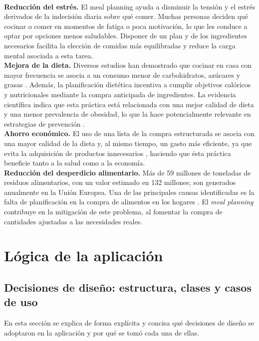 \documentclass[twoside, openright, 11pt]{report}
\begin{document}
	  \\
	  \textbf{Reducción del estrés.} El meal planning ayuda a disminuir la tensión y el estrés derivados de la indecisión diaria sobre qué comer. Muchas personas deciden qué cocinar o comer en momentos de fatiga o poca motivación, lo que les conduce a optar por opciones menos saludables. Disponer de un plan y de los ingredientes necesarios facilita la elección de comidas más equilibradas y reduce la carga mental asociada a esta tarea.
	  \\
	  \textbf{Mejora de la dieta.} Diversos estudios han demostrado que cocinar en casa con mayor frecuencia se asocia a un consumo menor de carbohidratos, azúcares y grasas \cite{johnshopkins2014}. Además, la planificación dietética incentiva a cumplir objetivos calóricos y nutricionales mediante la compra anticipada de ingredientes. La evidencia científica indica que esta práctica está relacionada con una mejor calidad de dieta y una menor prevalencia de obesidad, lo que la hace potencialmente relevante en estrategias de prevención \cite{ducrot2017}.
	  \\
	  \textbf{Ahorro económico.} El uso de una lista de la compra estructurada se asocia con una mayor calidad de la dieta y, al mismo tiempo, un gasto más eficiente, ya que evita la adquisición de productos innecesarios \cite{jneb2017}, haciendo que ésta práctica beneficie tanto a la salud como a la economía.
	  \\
	  \textbf{Reducción del desperdicio alimentario.} Más de 59 millones de toneladas de residuos alimentarios, con un valor estimado en 132 millones; son generados anualmente en la Unión Europea. Una de las principales causas identificadas es la falta de planificación en la compra de alimentos en los hogares \cite{europeancommission2020}. El \textit{meal planning} contribuye en la mitigación de este problema, al fomentar la compra de cantidades ajustadas a las necesidades reales.
	  
	  
	\section{Lógica de la aplicación}
		\subsection{Decisiones de diseño: estructura, clases y casos de uso}
		En esta sección se explica de forma explícita y concisa qué decisiones de diseño se adoptaron en la aplicación y por qué se tomó cada una de ellas.
		
\end{document}
